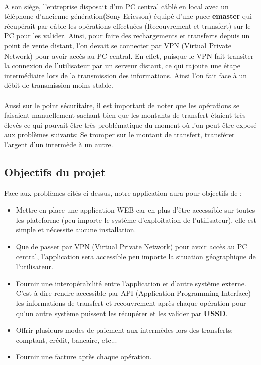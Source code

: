 		\paragraph{}A son siège, l'entreprise disposait d'un PC central câblé en local avec un téléphone d'ancienne génération(Sony Ericsson) équipé d'une puce \textbf{emaster} qui récupérait par câble les opérations effectuées (Recouvrement et transfert) sur le PC pour les valider. Ainsi, pour faire des rechargements et transferts depuis un point de vente distant, l'on devait se connecter par VPN (Virtual Private Network) pour avoir accès au PC central. En effet, puisque le VPN fait transiter la connexion de l'utilisateur par un serveur distant, ce qui rajoute une étape intermédiaire lors de la transmission des informations. Ainsi l'on fait face à un débit de transmission moins stable.
		\paragraph{}Aussi sur le point sécuritaire, il est important de noter que les opérations se faisaient manuellement sachant bien que les montants de transfert étaient très élevés ce qui pouvait être très problématique du moment où l'on peut être exposé aux problèmes suivants: Se tromper sur le montant de transfert, transférer l'argent d'un intermède	à un autre.\\
		
\subsection{Objectifs du projet}
	Face aux problèmes cités ci-dessus, notre application aura pour objectifs de :
	\begin{itemize}
		
		\item Mettre en place une application WEB car en plus d’être accessible sur toutes les plateforme (peu importe le système d'exploitation de l'utilisateur), elle est simple et nécessite aucune installation.\\
		
		
		
		\item Que de passer par VPN (Virtual Private Network) pour avoir accès au PC central, l’application sera accessible peu importe la situation géographique de l'utilisateur.\\
		
		\item Fournir une interopérabilité entre l'application et d'autre système externe. C'est à dire rendre accessible par API (Application Programming Interface) les informations de transfert et recouvrement après chaque opération pour qu'un autre système puissent les récupérer et les valider par \textbf{USSD}.\\
		
		\item Offrir plusieurs modes de paiement aux intermèdes lors des transferts: comptant, crédit, bancaire, etc...
		
		\item Fournir une facture après chaque opération.
		
		
	\end{itemize}
